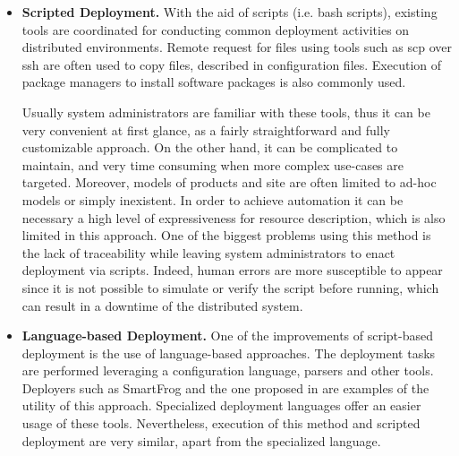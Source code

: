 \begin{itemize}
	\item \textbf{Scripted Deployment.} With the aid of scripts (i.e. bash scripts), existing tools are coordinated for conducting common deployment activities on distributed environments.
	Remote request for files using tools such as scp over ssh are often used to copy files, described in configuration files.
	Execution of package managers to install software packages is also commonly used.
	
	Usually system administrators are familiar with these tools, thus it can be very convenient at first glance, as a fairly straightforward and fully customizable approach.
	On the other hand, it can be complicated to maintain, and very time consuming when more complex use-cases are targeted.
	Moreover, models of products and site are often limited to ad-hoc models or simply inexistent.
	In order to achieve automation it can be necessary a high level of expressiveness for resource description, which is also limited in this approach.
	One of the biggest problems using this method is the lack of traceability while leaving system administrators to enact deployment via scripts.
	Indeed, human errors are more susceptible to appear since it is not possible to simulate or verify the script before running, which can result in a downtime of the distributed system.
	
	\item \textbf{Language-based Deployment.} One of the improvements of script-based deployment is the use of language-based approaches.
	The deployment tasks are performed leveraging a configuration language, parsers and other tools.
	Deployers such as SmartFrog\cite{goldsack2003smartfrog} and the one proposed in  \cite{wang2006language} are examples of the utility of this approach.
	Specialized deployment languages offer an easier usage of these tools.
	Nevertheless, execution of this method and scripted deployment are very similar, apart from the specialized language.
	

\end{itemize}
